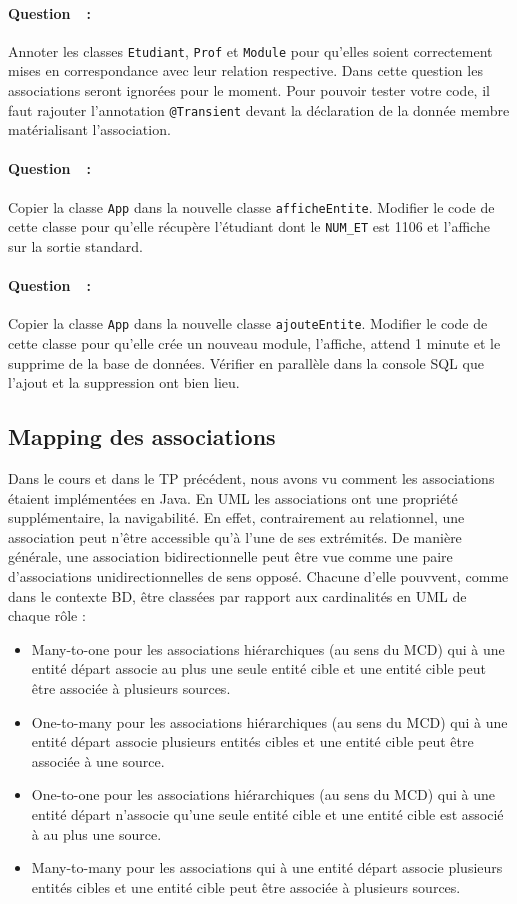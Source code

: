 \documentclass[a4paper,11pt]{article}
\newcounter{compteurQuestion}
\newcommand{\Question}{\paragraph*{Question~\thecompteurQuestion~:}\addtocounter{compteurQuestion}{1}}
\begin{document}
\Question Annoter les classes \texttt{Etudiant}, \texttt{Prof} et \texttt{Module} pour qu'elles soient correctement mises 
en correspondance avec leur relation respective. Dans cette question les associations seront ignorées pour le moment. 
Pour pouvoir tester votre code, il faut rajouter l'annotation \texttt{@Transient} devant la déclaration de la donnée 
membre matérialisant l'association.
\Question  Copier la classe \texttt{App} dans la nouvelle classe \texttt{afficheEntite}. Modifier le code de cette classe 
pour qu'elle récupère l'étudiant dont le \texttt{NUM\_ET} est 1106 et l'affiche sur la sortie standard. 
\Question  Copier la classe \texttt{App} dans la nouvelle classe \texttt{ajouteEntite}. Modifier le code de cette classe 
pour qu'elle crée un nouveau module, l'affiche, attend 1 minute et le supprime de la base de données. Vérifier en parallèle 
dans la console SQL que l'ajout et la suppression ont bien lieu.

\subsection{Mapping des associations}
Dans le cours et dans le TP précédent, nous avons vu comment les associations étaient implémentées en Java. En UML les 
associations ont une propriété supplémentaire, la navigabilité. En effet, contrairement au relationnel, une association
peut n'être accessible qu'à l'une de ses extrémités. De manière générale, une association bidirectionnelle peut être 
vue comme une paire d'associations unidirectionnelles de sens opposé. Chacune d'elle pouvvent, comme dans le contexte BD, être 
classées par rapport aux cardinalités en UML de chaque rôle :
\begin{itemize}
  \item Many-to-one pour les associations hiérarchiques (au sens du MCD) qui à une entité départ associe au plus une 
    seule entité cible et une entité cible peut être associée à plusieurs sources.   
  \item One-to-many pour les associations hiérarchiques (au sens du MCD) qui à une entité départ associe plusieurs 
    entités cibles et une entité cible peut être associée à une source.
  \item One-to-one pour les associations hiérarchiques (au sens du MCD) qui à une entité départ n'associe qu'une seule 
    entité cible et une entité cible est associé à au plus une source.
  \item Many-to-many pour les associations qui à une entité départ associe plusieurs entités cibles et une entité cible 
    peut être associée à plusieurs sources.
\end{itemize}
\end{document}
